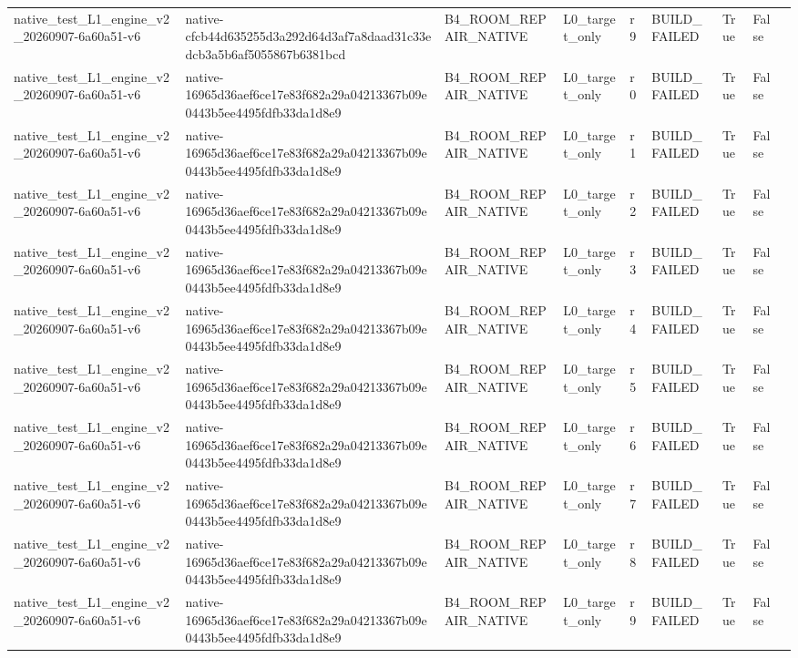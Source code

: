 \begin{tabular}{lllllllll}
native\_test\_L1\_engine\_v2\_20260907-6a60a51-v6 & native-cfcb44d635255d3a292d64d3af7a8daad31c33edcb3a5b6af5055867b6381bcd & B4\_ROOM\_REPAIR\_NATIVE & L0\_target\_only & r9 & BUILD\_FAILED & True & False &  \\
native\_test\_L1\_engine\_v2\_20260907-6a60a51-v6 & native-16965d36aef6ce17e83f682a29a04213367b09e0443b5ee4495fdfb33da1d8e9 & B4\_ROOM\_REPAIR\_NATIVE & L0\_target\_only & r0 & BUILD\_FAILED & True & False &  \\
native\_test\_L1\_engine\_v2\_20260907-6a60a51-v6 & native-16965d36aef6ce17e83f682a29a04213367b09e0443b5ee4495fdfb33da1d8e9 & B4\_ROOM\_REPAIR\_NATIVE & L0\_target\_only & r1 & BUILD\_FAILED & True & False &  \\
native\_test\_L1\_engine\_v2\_20260907-6a60a51-v6 & native-16965d36aef6ce17e83f682a29a04213367b09e0443b5ee4495fdfb33da1d8e9 & B4\_ROOM\_REPAIR\_NATIVE & L0\_target\_only & r2 & BUILD\_FAILED & True & False &  \\
native\_test\_L1\_engine\_v2\_20260907-6a60a51-v6 & native-16965d36aef6ce17e83f682a29a04213367b09e0443b5ee4495fdfb33da1d8e9 & B4\_ROOM\_REPAIR\_NATIVE & L0\_target\_only & r3 & BUILD\_FAILED & True & False &  \\
native\_test\_L1\_engine\_v2\_20260907-6a60a51-v6 & native-16965d36aef6ce17e83f682a29a04213367b09e0443b5ee4495fdfb33da1d8e9 & B4\_ROOM\_REPAIR\_NATIVE & L0\_target\_only & r4 & BUILD\_FAILED & True & False &  \\
native\_test\_L1\_engine\_v2\_20260907-6a60a51-v6 & native-16965d36aef6ce17e83f682a29a04213367b09e0443b5ee4495fdfb33da1d8e9 & B4\_ROOM\_REPAIR\_NATIVE & L0\_target\_only & r5 & BUILD\_FAILED & True & False &  \\
native\_test\_L1\_engine\_v2\_20260907-6a60a51-v6 & native-16965d36aef6ce17e83f682a29a04213367b09e0443b5ee4495fdfb33da1d8e9 & B4\_ROOM\_REPAIR\_NATIVE & L0\_target\_only & r6 & BUILD\_FAILED & True & False &  \\
native\_test\_L1\_engine\_v2\_20260907-6a60a51-v6 & native-16965d36aef6ce17e83f682a29a04213367b09e0443b5ee4495fdfb33da1d8e9 & B4\_ROOM\_REPAIR\_NATIVE & L0\_target\_only & r7 & BUILD\_FAILED & True & False &  \\
native\_test\_L1\_engine\_v2\_20260907-6a60a51-v6 & native-16965d36aef6ce17e83f682a29a04213367b09e0443b5ee4495fdfb33da1d8e9 & B4\_ROOM\_REPAIR\_NATIVE & L0\_target\_only & r8 & BUILD\_FAILED & True & False &  \\
native\_test\_L1\_engine\_v2\_20260907-6a60a51-v6 & native-16965d36aef6ce17e83f682a29a04213367b09e0443b5ee4495fdfb33da1d8e9 & B4\_ROOM\_REPAIR\_NATIVE & L0\_target\_only & r9 & BUILD\_FAILED & True & False &  \\

\end{tabular}

